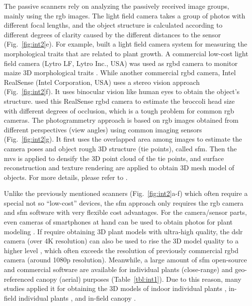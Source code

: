 The passive scanners rely on analyzing the passively received image groups, mainly using the \gls{rgb} images. The light field camera takes a group of photos with different focal lengths, and the object structure is calculated according to different degrees of clarity caused by the different distances to the sensor (Fig.~\ref{fig:int2}e). For example, \citet{apelt_phytotyping_2015} built a light field camera system for measuring the morphological traits that are related to plant growth. A commercial low-cost light field camera (Lytro LF, Lytro Inc., USA) was used as \gls{rgbd} camera to monitor maize 3D morphological traits \citep{schima_imagine_2016}. While another commercial \gls{rgbd} camera, Intel RealSense (Intel Corporation, USA) uses a stereo vision approach (Fig.~\ref{fig:int2}f). It uses binocular vision like human eyes to obtain the object's structure. \citet{blok_image_2021} used this RealSense \gls{rgbd} camera to estimate the broccoli head size with different degrees of occlusion, which is a tough problem for common \gls{rgb} cameras. The photogrammetry approach is based on \gls{rgb} images obtained from different perspectives (view angles) using common imaging sensors (Fig.~\ref{fig:int2}g). It first uses the overlapped area among images to estimate the camera poses and object rough 3D structure (tie points), called \acrfull{sfm}. Then the \gls{mvs} is applied to densify the 3D point cloud of the tie points, and surface reconstruction and texture rendering are applied to obtain 3D mesh model of objects. For more details, please refer to \citep{hartley_multiple_2000,snavely_scene_2010}. 

Unlike the previously mentioned scanners (Fig.~\ref{fig:int2}a-f) which often require a special not so ``low-cost'' devices, the \gls{sfm} approach only requires the \gls{rgb} camera and \gls{sfm} software with very flexible cost advantages. For the camera/sensor parts, even cameras of smartphones at hand can be used to obtain photos for plant modeling \citep{li_measuring_2020}. If require obtaining 3D plant models with ultra-high quality, the \gls{dslr} camera (over 4K resolution) can also be used to rise the 3D model quality to a higher level \citep{nguyen_3d_2016, drofova_use_2023}, which often exceeds the resolution of previously commercial \gls{rgbd} camera (around 1080p resolution). Meanwhile, a large amount of \gls{sfm} open-source and commercial software are available for individual plants (close-range) and geo-referenced canopy (aerial) purposes (Table~\ref{tbl:int1}). Due to this reason, many studies applied it for obtaining the 3D models of indoor individual plants \citep{wu_mvs-pheno_2020, zhou_automated_2019}, in-field individual plants \citep{jay_field_2015, herrero_structural_2023}, and in-field canopy \citep{kim_modeling_2018, herrero_canopy_2020}.

